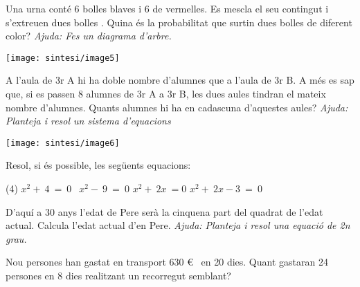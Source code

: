 \begin{mylist}
	
 \vspace{-1.5cm}
 \exer[2] \begin{minipage}[t]{0.7\textwidth}
 	Una urna conté 6 bolles blaves i 6 de vermelles. Es mescla el seu contingut i s'extreuen dues bolles \textbf{}. Quina és la probabilitat que surtin dues bolles de diferent color? \textit{Ajuda: Fes un diagrama d'arbre.}
 \end{minipage}
 \begin{minipage}{0.3\textwidth}
 	\centering
 	\vspace{1.5cm}
 	\texttt{[image: sintesi/image5]}
 \end{minipage}
	
	  
	\vspace{-1.5cm}
	\exer[2] \begin{minipage}[t]{0.7\textwidth}
		 A l'aula de 3r A hi ha doble nombre d'alumnes que a l'aula de 3r B. A més es sap que, si es passen 8 alumnes de 3r A a 3r B, les dues aules tindran el mateix nombre d'alumnes. Quants alumnes hi ha en cadascuna d'aquestes aules? \textit{Ajuda: Planteja i resol un sistema d'equacions}
	\end{minipage}
	\begin{minipage}{0.3\textwidth}
		\centering
		\vspace{1.5cm}
		\texttt{[image: sintesi/image6]}
	\end{minipage}
	
		
		\exer[2]  Resol, si és possible, les següents equacions:
		\begin{tasks}(4)
			\task $x^2+\ 4\ =\ 0$
			\task ${\ \ x}^2-\ 9\ =\ 0$
			\task $ x^2+\ 2x\ =0$
			\task $ x^2+\ 2x-3\ =\ 0$
		\end{tasks} 
	
		\exer[2]  D'aquí a 30 anys l'edat de Pere serà la cinquena part del quadrat de l'edat actual. Calcula l'edat actual d'en Pere. \textit{Ajuda: Planteja i resol una equació de 2n grau.}
	
	
		\exer[2] Nou persones han gastat en transport 630 \euro{} \ en 20 dies. Quant gastaran 24 persones en 8 dies realitzant un recorregut semblant?
	

\end{mylist}
